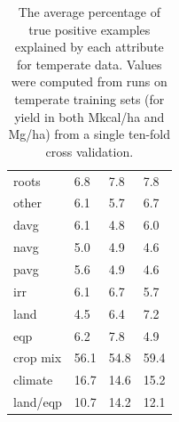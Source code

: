 \documentclass[12pt,twoside]{article}
\begin{document}
\begin{table}
{\begin{tabular}{llll}
roots & 6.8 & 7.8 & 7.8 \\
other & 6.1 & 5.7 & 6.7 \\
davg & 6.1 & 4.8 & 6.0 \\
navg & 5.0 & 4.9 & 4.6 \\
pavg & 5.6 & 4.9 & 4.6 \\
irr & 6.1 & 6.7 & 5.7 \\
land & 4.5 & 6.4 & 7.2 \\
eqp & 6.2 & 7.8 & 4.9 \\
\midrule
crop mix & 56.1 & 54.8 & 59.4 \\
climate & 16.7 & 14.6 & 15.2 \\
land/eqp & 10.7 & 14.2 & 12.1 \\
\bottomrule
\end{tabular}
\label{t.ny.temp_percentages}
}
\captionsetup{width=.9\textwidth}
\caption[Percentage of Examples Explained by Attribute (Temperate Data)]{The average percentage of true positive examples explained by each attribute for temperate data. Values were computed from runs on temperate training sets (for yield in both Mkcal/ha and Mg/ha) from a single ten-fold cross validation.}
\label{temperate_percentages}
\end{table}
\end{document}
